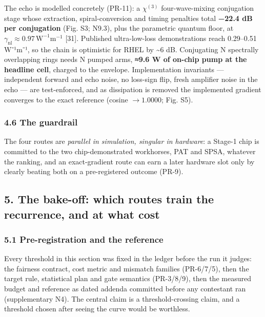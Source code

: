 \documentclass[
  10pt,
]{article}
\begin{document}
The echo is modelled concretely (PR-11): a \(\chi^{(3)}\)
four-wave-mixing conjugation stage whose extraction, spiral-conversion
and timing penalties total \textbf{−22.4 dB per conjugation} (Fig. S3;
N9.3), plus the parametric quantum floor, at
\(\gamma_\text{nl} \approx 0.97\,\text{W}^{-1}\text{m}^{-1}\) {[}31{]}.
Published ultra-low-loss demonstrations reach 0.29--0.51 W⁻¹m⁻¹, so the
chain is optimistic for RHEL by \textasciitilde6 dB. Conjugating N
spectrally overlapping rings needs N pumped arms, \textbf{≈9.6 W of
on-chip pump at the headline cell}, charged to the envelope.
Implementation invariants --- independent forward and echo noise, no
loss-sign flip, fresh amplifier noise in the echo --- are test-enforced,
and as dissipation is removed the implemented gradient converges to the
exact reference (cosine \(\to 1.0000\); Fig. S5).

\subsubsection{4.6 The guardrail}\label{the-guardrail}

The four routes are \emph{parallel in simulation, singular in hardware}:
a Stage-1 chip is committed to the two chip-demonstrated workhorses, PAT
and SPSA, whatever the ranking, and an exact-gradient route can earn a
later hardware slot only by clearly beating both on a pre-registered
outcome (PR-9).

\subsection{5. The bake-off: which routes train the recurrence, and at
what
cost}\label{the-bake-off-which-routes-train-the-recurrence-and-at-what-cost}

\subsubsection{5.1 Pre-registration and the
reference}\label{pre-registration-and-the-reference}

Every threshold in this section was fixed in the ledger before the run
it judges: the fairness contract, cost metric and mismatch families
(PR-6/7/5), then the target rule, statistical plan and gate semantics
(PR-3/8/9), then the measured budget and reference as dated addenda
committed before any contestant ran (supplementary N4). The central
claim is a threshold-crossing claim, and a threshold chosen after seeing
the curve would be worthless.
\end{document}
